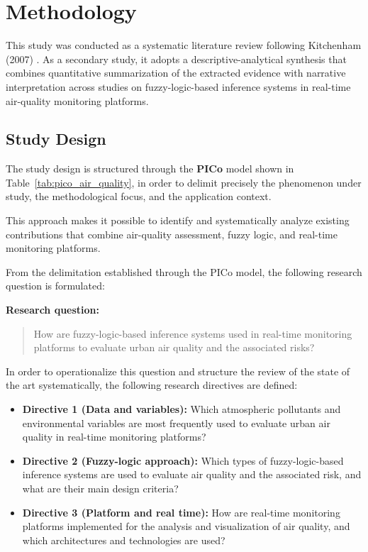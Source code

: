 \section{Methodology}

This study was conducted as a systematic literature review following Kitchenham (2007) \cite{kitchenham2007}. As a secondary study, it adopts a descriptive-analytical synthesis that combines quantitative summarization of the extracted evidence with narrative interpretation across studies on fuzzy-logic-based inference systems in real-time air-quality monitoring platforms.

\subsection{Study Design}
The study design is structured through the \textbf{PICo} model shown in Table~\ref{tab:pico_air_quality}, in order to delimit precisely the phenomenon under study, the methodological focus, and the application context.



This approach makes it possible to identify and systematically analyze existing contributions that combine air-quality assessment, fuzzy logic, and real-time monitoring platforms.

From the delimitation established through the PICo model, the following research question is formulated:

\textbf{Research question:}

\begin{quote}
How are fuzzy-logic-based inference systems used in real-time monitoring platforms to evaluate urban air quality and the associated risks?
\end{quote}

In order to operationalize this question and structure the review of the state of the art systematically, the following research directives are defined:

\begin{itemize}
    \item \textbf{Directive 1 (Data and variables):}
    Which atmospheric pollutants and environmental variables are most frequently used to evaluate urban air quality in real-time monitoring platforms?

    \item \textbf{Directive 2 (Fuzzy-logic approach):}
    Which types of fuzzy-logic-based inference systems are used to evaluate air quality and the associated risk, and what are their main design criteria?

    \item \textbf{Directive 3 (Platform and real time):}
    How are real-time monitoring platforms implemented for the analysis and visualization of air quality, and which architectures and technologies are used?
\end{itemize}

